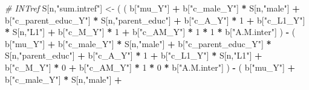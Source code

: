 \documentclass[
]{book}
\newenvironment{Shaded}{\begin{snugshade}}{\end{snugshade}}
\newcommand{\CommentTok}[1]{\textcolor[rgb]{0.56,0.35,0.01}{\textit{#1}}}
\newcommand{\DecValTok}[1]{\textcolor[rgb]{0.00,0.00,0.81}{#1}}
\newcommand{\NormalTok}[1]{#1}
\newcommand{\OtherTok}[1]{\textcolor[rgb]{0.56,0.35,0.01}{#1}}
\newcommand{\SpecialCharTok}[1]{\textcolor[rgb]{0.81,0.36,0.00}{\textbf{#1}}}
\newcommand{\StringTok}[1]{\textcolor[rgb]{0.31,0.60,0.02}{#1}}
\begin{document}
\begin{Shaded}
\begin{Highlighting}[]
    \CommentTok{\# INTref }
\NormalTok{    S[n,}\StringTok{"sum.intref"}\NormalTok{] }\OtherTok{\textless{}{-}}\NormalTok{ ( ( b[}\StringTok{"mu\_Y"}\NormalTok{] }\SpecialCharTok{+} 
\NormalTok{                               b[}\StringTok{"c\_male\_Y"}\NormalTok{] }\SpecialCharTok{*}\NormalTok{ S[n,}\StringTok{"male"}\NormalTok{] }\SpecialCharTok{+} 
\NormalTok{                               b[}\StringTok{"c\_parent\_educ\_Y"}\NormalTok{] }\SpecialCharTok{*}\NormalTok{ S[n,}\StringTok{"parent\_educ"}\NormalTok{] }\SpecialCharTok{+} 
\NormalTok{                               b[}\StringTok{"c\_A\_Y"}\NormalTok{] }\SpecialCharTok{*} \DecValTok{1} \SpecialCharTok{+} 
\NormalTok{                               b[}\StringTok{"c\_L1\_Y"}\NormalTok{] }\SpecialCharTok{*}\NormalTok{ S[n,}\StringTok{"L1"}\NormalTok{] }\SpecialCharTok{+}
\NormalTok{                               b[}\StringTok{"c\_M\_Y"}\NormalTok{] }\SpecialCharTok{*} \DecValTok{1} \SpecialCharTok{+}
\NormalTok{                               b[}\StringTok{"c\_AM\_Y"}\NormalTok{] }\SpecialCharTok{*} \DecValTok{1} \SpecialCharTok{*} \DecValTok{1} \SpecialCharTok{*}\NormalTok{ b[}\StringTok{"A.M.inter"}\NormalTok{] ) }\SpecialCharTok{{-}} 
\NormalTok{                             ( b[}\StringTok{"mu\_Y"}\NormalTok{] }\SpecialCharTok{+} 
\NormalTok{                                 b[}\StringTok{"c\_male\_Y"}\NormalTok{] }\SpecialCharTok{*}\NormalTok{ S[n,}\StringTok{"male"}\NormalTok{] }\SpecialCharTok{+} 
\NormalTok{                                 b[}\StringTok{"c\_parent\_educ\_Y"}\NormalTok{] }\SpecialCharTok{*}\NormalTok{ S[n,}\StringTok{"parent\_educ"}\NormalTok{] }\SpecialCharTok{+} 
\NormalTok{                                 b[}\StringTok{"c\_A\_Y"}\NormalTok{] }\SpecialCharTok{*} \DecValTok{1} \SpecialCharTok{+} 
\NormalTok{                                 b[}\StringTok{"c\_L1\_Y"}\NormalTok{] }\SpecialCharTok{*}\NormalTok{ S[n,}\StringTok{"L1"}\NormalTok{] }\SpecialCharTok{+}
\NormalTok{                                 b[}\StringTok{"c\_M\_Y"}\NormalTok{] }\SpecialCharTok{*} \DecValTok{0} \SpecialCharTok{+}
\NormalTok{                                 b[}\StringTok{"c\_AM\_Y"}\NormalTok{] }\SpecialCharTok{*} \DecValTok{1} \SpecialCharTok{*} \DecValTok{0} \SpecialCharTok{*}\NormalTok{ b[}\StringTok{"A.M.inter"}\NormalTok{] ) }\SpecialCharTok{{-}} 
\NormalTok{                             ( b[}\StringTok{"mu\_Y"}\NormalTok{] }\SpecialCharTok{+} 
\NormalTok{                                 b[}\StringTok{"c\_male\_Y"}\NormalTok{] }\SpecialCharTok{*}\NormalTok{ S[n,}\StringTok{"male"}\NormalTok{] }\SpecialCharTok{+} 

\end{Highlighting}
\end{Shaded}
\end{document}
